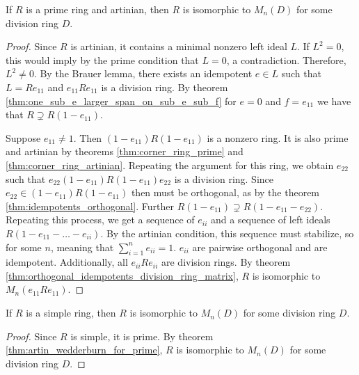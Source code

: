   \begin{theorem}
    \label{thm:artin_wedderburn_for_prime}
    If $R$ is a prime ring and artinian, then $R$ is isomorphic to $M_n(D)$ for some division ring $D$.
  \end{theorem}
  \begin{proof}
    Since $R$ is artinian, it contains a minimal nonzero left ideal $L$. If $L^2 = 0$, this would imply by the prime condition that $L = 0$, a contradiction. Therefore, $L^2 \neq 0$. By the Brauer lemma, there exists an idempotent $e \in L$ such that $L = Re_{11}$ and $e_{11}Re_{11}$ is a division ring. By theorem \ref{thm:one_sub_e_larger_span_on_sub_e_sub_f} for $e = 0$ and $f = e_{11}$ we have that $R \supsetneq R(1 - e_{11})$.

    Suppose $e_{11} \neq 1$. Then $(1 - e_{11}) R (1 - e_{11})$ is a nonzero ring. It is also prime and artinian by theorems \ref{thm:corner_ring_prime} and \ref{thm:corner_ring_artinian}. Repeating the argument for this ring, we obtain $e_{22}$ such that $e_{22}(1 - e_{11}) R (1 - e_{11})e_{22}$ is a division ring. Since $e_{22} \in (1 - e_{11}) R (1 - e_{11})$ then must be orthogonal, as by the theorem \ref{thm:idempotents_orthogonal}. Further $R (1 - e_{11}) \supsetneq R (1 - e_{11} - e_{22})$. Repeating this process, we get a sequence of $e_{ii}$ and a sequence of left ideals $R(1 - e_{11} - \ldots - e_{ii})$. By the artinian condition, this sequence must stabilize, so for some $n$, meaning that $\sum_{i = 1}^{n} e_{ii} = 1$. $e_{ii}$ are pairwise orthogonal and are idempotent. Additionally, all $e_{ii} R e_{ii}$ are division rings. By theorem \ref{thm:orthogonal_idempotents_division_ring_matrix}, $R$ is isomorphic to $M_n(e_{11}Re_{11})$.
  \end{proof}

  \begin{theorem}
    \label{thm:artin_wedderburn_for_simple}
    If $R$ is a simple ring, then $R$ is isomorphic to $M_n(D)$ for some division ring $D$.
  \end{theorem}
  \begin{proof}
    Since $R$ is simple, it is prime. By theorem \ref{thm:artin_wedderburn_for_prime}, $R$ is isomorphic to $M_n(D)$ for some division ring $D$.
  \end{proof}


